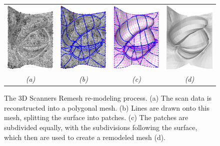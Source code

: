 \documentclass[10pt,oneside,fleqn,a4paper]{book}
\begin{document}
\begin{figure}
\begin{center}
\begin{tabular}{cccc}
\includegraphics[width=3.18cm]{../images/eye_dense} &
\includegraphics[width=3.18cm]{../images/eye_polylines} &
\includegraphics[width=3.18cm]{../images/eye_generate} &
\includegraphics[width=3.18cm]{../images/eye_remesh} \\
{\it(a)} & {\it(b)} & {\it(c)} & {\it(d)}
\end{tabular}
\caption[The 3D Scanners Remesh re-modeling process]{\label{fig:remesh}The 3D Scanners Remesh re-modeling process. (a) The scan data is reconstructed into a polygonal mesh. (b) Lines are drawn onto this mesh, splitting the surface into patches. (c) The patches are subdivided equally, with the subdivisions following the surface, which then are used to create a remodeled mesh (d).}
\end{center}
\end{figure}
\end{document}
